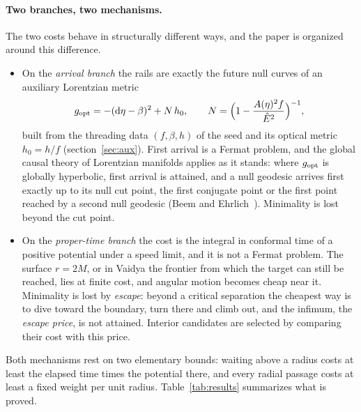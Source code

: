 \documentclass[aip,jmp,amsmath,amssymb,reprint]{revtex4-2}
\newcommand{\Ehat}{\hat E}
\newcommand{\dd}{\mathrm{d}}
\newcommand{\gopt}{g_{\rm opt}}
\theoremstyle{plain}
\theoremstyle{definition}
\begin{document}
\paragraph{Two branches, two mechanisms.} The two costs behave in structurally different ways, and
the paper is organized around this difference.
\begin{itemize}
\item On the \emph{arrival branch} the rails are exactly the future null curves of an auxiliary
  Lorentzian metric
  \begin{equation}
    \gopt=-(\dd\eta-\beta)^2+N\,h_0,\qquad N=\Big(1-\frac{A(\eta)^2f}{\Ehat^2}\Big)^{-1},
    \label{eq:gopt-intro}
  \end{equation}
  built from the threading data $(f,\beta,h)$ of the seed and its optical metric $h_0=h/f$
  (section~\ref{sec:aux}). First arrival is a Fermat problem, and the global causal theory of
  Lorentzian manifolds applies as it stands: where $\gopt$ is globally hyperbolic, first arrival is
  attained, and a null geodesic arrives first exactly up to its null cut point, the first conjugate
  point or the first point reached by a second null geodesic (Beem and
  Ehrlich~\cite{BeemEhrlich1979GRG}). Minimality is lost beyond the cut point.
\item On the \emph{proper-time branch} the cost is the integral in conformal time of a positive
  potential under a speed limit, and it is not a Fermat problem. The surface $r=2M$, or in Vaidya the
  frontier from which the target can still be reached, lies at finite cost, and angular motion
  becomes cheap near it. Minimality is lost by \emph{escape}: beyond a critical separation the
  cheapest way is to dive toward the boundary, turn there and climb out, and the infimum, the
  \emph{escape price}, is not attained. Interior candidates are selected by comparing their cost with
  this price.
\end{itemize}
Both mechanisms rest on two elementary bounds: waiting above a radius costs at least the elapsed
time times the potential there, and every radial passage costs at least a fixed weight per unit
radius. Table~\ref{tab:results} summarizes what is proved.
\end{document}
